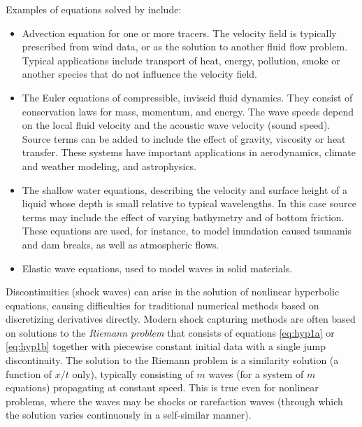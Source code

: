 Examples of equations solved by \clawpack include:
\begin{itemize}
  \item  Advection equation for one or more tracers.  The velocity field is
typically prescribed from wind data, or as the solution to another fluid
flow problem.  Typical applications include transport of heat, energy,
pollution, smoke or another species that do not influence the velocity field.

    \item The Euler equations of compressible, inviscid fluid dynamics.
        They consist of conservation laws for mass, momentum, and energy.
        The wave speeds depend on the local fluid velocity
        and the acoustic wave velocity (sound speed).  Source terms can be added
        to include the effect of gravity, viscosity or heat transfer.
        These systems have important applications in
        aerodynamics, climate and weather modeling, and astrophysics.
    \item The shallow water equations, describing the velocity and
        surface height of a liquid whose depth is small relative to
        typical wavelengths.  In this case source terms may include
        the effect of varying bathymetry and of bottom friction.
        These equations are used, for instance, to model inundation
        caused tsunamis and dam breaks, as well as atmospheric flows.
    \item Elastic wave equations, used to model waves in solid
    materials.
\end{itemize}

Discontinuities (shock waves) can arise in the solution of nonlinear
hyperbolic equations, causing difficulties for traditional numerical
methods based on discretizing derivatives directly.  Modern shock
capturing methods are often based on solutions to the {\em Riemann
problem} that consists of equations \cref{eq:hyp1a} or
\cref{eq:hyp1b} together with piecewise constant initial data with a
single jump discontinuity.  The solution to the Riemann problem is a
similarity solution (a function of $x/t$ only), typically consisting
of $m$ waves (for a system of $m$ equations) propagating at constant
speed.  This is true even for nonlinear problems, where the waves may
be shocks or rarefaction waves (through which the
solution varies continuously in a self-similar manner).

